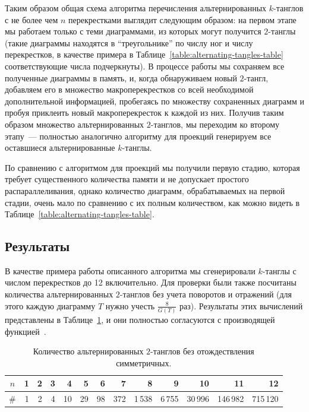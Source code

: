 \documentclass[12pt]{article}
\theoremstyle{plain}
\theoremstyle{definition}
\begin{document}
		Таким образом общая схема алгоритма перечисления альтернированных $k$-танглов с не более чем $n$ перекрестками выглядит
		следующим образом: на первом этапе мы работаем только с теми диаграммами, из которых могут получится $2$-танглы (такие
		диаграммы находятся в ``треугольнике'' по числу ног и числу перекрестков, в качестве примера в
		Таблице~\ref{table:alternating-tangles-table} соответствующие числа подчеркнуты). В процессе работы мы сохраняем все
		полученные диаграммы в память, и, когда обнаруживаем новый $2$-тангл, добавляем его в множество макроперекрестков со всей
		необходимой дополнительной информацией, пробегаясь по множеству сохраненных диаграмм и пробуя приклеить новый макроперекресток к
		каждой из них. Получив таким образом множество альтернированных $2$-танглов, мы переходим ко второму этапу~--- полностью
		аналогично алгоритму для проекций генерируем все оставшиеся альтернированные $k$-танглы.

		По сравнению с алгоритмом для проекций мы получили первую стадию, которая требует существенного количества памяти и не допускает
		простого распараллеливания, однако количество диаграмм, обрабатываемых на первой стадии, очень мало по сравнению с их полным
		количеством, как можно видеть в Таблице~\ref{table:alternating-tangles-table}.

	\subsection{Результаты}

		В качестве примера работы описанного алгоритма мы сгенерировали $k$-танглы с числом перекрестков до 12 включительно.
		Для проверки были также посчитаны количества альтернированных $2$-танглов без учета поворотов и отражений (для этого
		каждую диаграмму $T$ нужно учесть $\frac{8}{G(T)}$ раз). Результаты этих вычислений представлены в
		Таблице~\ref{table:old-results-table}, и они полностью согласуются с производящей функцией~\cite{SundbergThistlethwaite1998}.

		\begin{table}[ht]
			\footnotesize
			\caption{\small Количество альтернированных $2$-танглов без отождествления симметричных.\label{table:old-results-table}}
			\centering
			\begin{tabular}{|c||r|r|r|r|r|r|r|r|r|r|r|r|}
				\hline
				$n$ & 1 & 2 & 3 &  4 &  5 &  6 &   7 &      8 &      9 &      10 &       11 &       12 \\
				\hline\hline
				\#  & 1 & 2 & 4 & 10 & 29 & 98 & 372 & 1\,538 & 6\,755 & 30\,996 & 146\,982 & 715\,120 \\
				\hline
			\end{tabular}
		\end{table}
\end{document}
